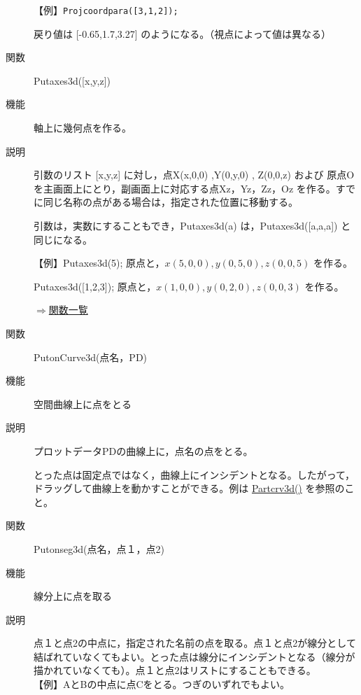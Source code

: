 \documentclass[papersize,a4paper,12pt,uplatex]{jsarticle}
\begin{document}
\begin{description}
\vspace{\baselineskip}
【例】\verb|Projcoordpara([3,1,2]);|

 戻り値は  [-0.65,1.7,3.27]   のようになる。（視点によって値は異なる）


\vspace{\baselineskip}
\hypertarget{putaxes3d}{}
\item[関数]  Putaxes3d([x,y,z])
\item[機能]  軸上に幾何点を作る。
\item[説明]  引数のリスト [x,y,z] に対し，点X(x,0,0) ,Y(0,y,0) , Z(0,0,z) および 原点Oを主画面上にとり，副画面上に対応する点Xz，Yz，Zz，Oz を作る。すでに同じ名称の点がある場合は，指定された位置に移動する。

引数は，実数にすることもでき，Putaxes3d(a) は，Putaxes3d([a,a,a]) と同じになる。
  
\vspace{\baselineskip}
【例】Putaxes3d(5);  原点と，$x(5,0,0),y(0,5,0),z(0,0,5)$ を作る。

 Putaxes3d([1,2,3]);  原点と，$x(1,0,0),y(0,2,0),z(0,0,3)$ を作る。

\begin{flushright} \hyperlink{functionlist}{$\Rightarrow$関数一覧}\end{flushright}

\vspace{\baselineskip}
\hypertarget{putonCurve3d}{}
\item[関数]  PutonCurve3d(点名，PD)
\item[機能]  空間曲線上に点をとる
\item[説明]  プロットデータPDの曲線上に，点名の点をとる。

とった点は固定点ではなく，曲線上にインシデントとなる。したがって，ドラッグして曲線上を動かすことができる。例は \hyperlink{partcrv3d}{Partcrv3d()} を参照のこと。

\vspace{\baselineskip}
\hypertarget{putonseg3d}{}
\item[関数]  Putonseg3d(点名，点１，点2)
\item[機能]  線分上に点を取る
\item[説明]  点１と点2の中点に，指定された名前の点を取る。点１と点2が線分として結ばれていなくてもよい。とった点は線分にインシデントとなる（線分が描かれていなくても）。点１と点2はリストにすることもできる。\\
\vspace{\baselineskip}
【例】AとBの中点に点Cをとる。つぎのいずれでもよい。


\end{description}
\end{document}

